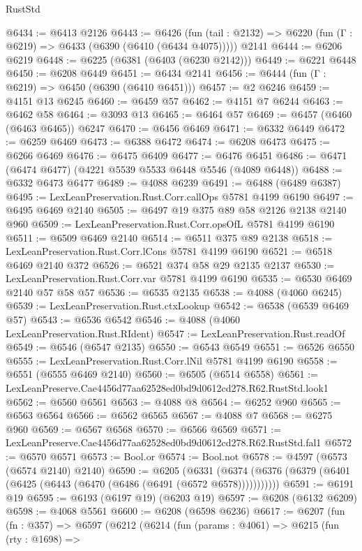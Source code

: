 \begin{lexlean}{RustStd}
\begin{coremodule}
@6434 := @6413 @2126
@6443 := @6426
    (fun (tail : @2132) => @6220 (fun (Γ : @6219) => @6433 (@6390 (@6410 (@6434 @4075)))))
    @2141
@6444 := @6206 @6219
@6448 := @6225 (@6381 (@6403 (@6230 @2142)))
@6449 := @6221 @6448
@6450 := @6208 @6449
@6451 := @6434 @2141
@6456 := @6444 (fun (Γ : @6219) => @6450 (@6390 (@6410 @6451)))
@6457 := @2 @6246
@6459 := @4151 @13 @6245
@6460 := @6459 @57
@6462 := @4151 @7 @6244
@6463 := @6462 @58
@6464 := @3093 @13
@6465 := @6464 @57
@6469 := @6457 (@6460 (@6463 @6465)) @6247
@6470 := @6456 @6469
@6471 := @6332 @6449
@6472 := @6259 @6469
@6473 := @6388 @6472
@6474 := @6208 @6473
@6475 := @6266 @6469
@6476 := @6475 @6409
@6477 := @6476 @6451
@6486 := @6471 (@6474 @6477) (@4221 @5539 @5533 @6448 @5546 (@4089 @6448))
@6488 := @6332 @6473 @6477
@6489 := @4088 @6239
@6491 := @6488 (@6489 @6387)
@6495 := LexLeanPreservation.Rust.Corr.callOps @5781 @4199 @6190
@6497 := @6495 @6469 @2140
@6505 := @6497 @19 @375 @89 @58 @2126 @2138 @2140 @960
@6509 := LexLeanPreservation.Rust.Corr.opsOfL @5781 @4199 @6190
@6511 := @6509 @6469 @2140
@6514 := @6511 @375 @89 @2138
@6518 := LexLeanPreservation.Rust.Corr.lCons @5781 @4199 @6190
@6521 := @6518 @6469 @2140 @372
@6526 := @6521 @374 @58 @29 @2135 @2137
@6530 := LexLeanPreservation.Rust.Corr.var @5781 @4199 @6190
@6535 := @6530 @6469 @2140 @57 @58 @57
@6536 := @6535 @2135
@6538 := @4088 (@4060 @6245)
@6539 := LexLeanPreservation.Rust.ctxLookup
@6542 := @6538 (@6539 @6469 @57)
@6543 := @6536 @6542
@6546 := @4088 (@4060 LexLeanPreservation.Rust.RIdent)
@6547 := LexLeanPreservation.Rust.readOf
@6549 := @6546 (@6547 @2135)
@6550 := @6543 @6549
@6551 := @6526 @6550
@6555 := LexLeanPreservation.Rust.Corr.lNil @5781 @4199 @6190
@6558 := @6551 (@6555 @6469 @2140)
@6560 := @6505 (@6514 @6558)
@6561 := LexLeanPreserve.Cae4456d77aa62528ed0bd9d0612cd278.R62.RustStd.look1
@6562 := @6560 @6561
@6563 := @4088 @8
@6564 := @6252 @960
@6565 := @6563 @6564
@6566 := @6562 @6565
@6567 := @4088 @7
@6568 := @6275 @960
@6569 := @6567 @6568
@6570 := @6566 @6569
@6571 := LexLeanPreserve.Cae4456d77aa62528ed0bd9d0612cd278.R62.RustStd.fal1
@6572 := @6570 @6571
@6573 := Bool.or
@6574 := Bool.not
@6578 := @4597 (@6573 (@6574 @2140) @2140)
@6590 := @6205
    (@6331 (@6374 (@6376 (@6379 (@6401 (@6425 (@6443 (@6470 (@6486 (@6491 (@6572 @6578)))))))))))
@6591 := @6191 @19
@6595 := @6193 (@6197 @19) (@6203 @19)
@6597 := @6208 (@6132 @6209)
@6598 := @4068 @5561
@6600 := @6208 (@6598 @6236)
@6617 := @6207
    (fun (fn : @357) =>
    @6597
      (@6212
        (@6214
          (fun (params : @4061) =>
          @6215
            (fun (rty : @1698) =>

\end{coremodule}
\end{lexlean}
